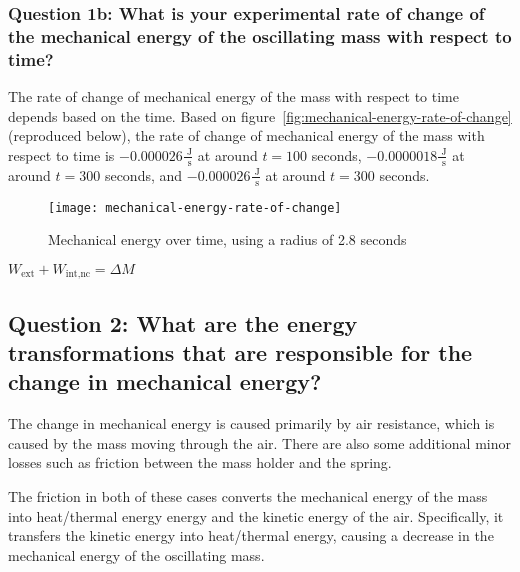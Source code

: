\documentclass{article}
\begin{document}
            \subsubsection{Question 1b: What is your experimental rate of change of the mechanical energy of the oscillating mass with respect to time?}
                The rate of change of mechanical energy of the mass with respect to time depends based on the time. Based on figure~\ref{fig:mechanical-energy-rate-of-change} (reproduced below), the rate of change of mechanical energy of the mass with respect to time is $-0.000026 \frac{\text{ J}}{\text{ s}}$ at around $t=100$ seconds, $-0.0000018 \frac{\text{ J}}{\text{ s}}$ at around $t=300$ seconds, and $-0.000026 \frac{\text{ J}}{\text{ s}}$ at around $t=300$ seconds.
                
                \begin{figure}[H]
                    \centering
                    \texttt{[image: mechanical-energy-rate-of-change]}
                    \caption{Mechanical energy over time, using a radius of 2.8 seconds}
                    \label{fig:mechanical-energy-rate-of-change-2}
                \end{figure}

                $W_{\text{ext}} + W_{\text{int,nc}} = \Delta M$

        
        \subsection{Question 2: What are the energy transformations that are responsible for the change in mechanical energy?}
            The change in mechanical energy is caused primarily by air resistance, which is caused by the mass moving through the air.
            There are also some additional minor losses such as friction between the mass holder and the spring.
            
            The friction in both of these cases converts the mechanical energy of the mass into heat/thermal energy energy and the kinetic energy of the air.
            Specifically, it transfers the kinetic energy into heat/thermal energy, causing a decrease in the mechanical energy of the oscillating mass.
    
    
\end{document}
